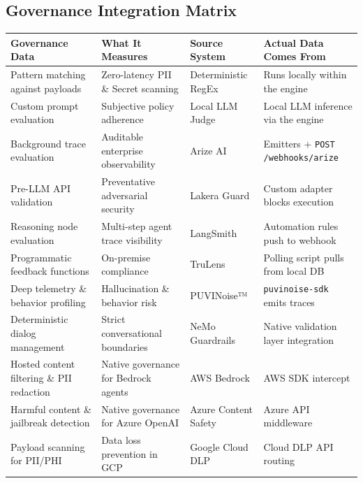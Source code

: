 \documentclass[11pt,a4paper]{article}
\begin{document}
\subsection{Governance Integration Matrix}

\begin{center}
\renewcommand{\arraystretch}{1.4}
\small
{}
\begin{tabularx}{\textwidth}{| >{\raggedright\arraybackslash}X >{\raggedright\arraybackslash}X >{\raggedright\arraybackslash}p{3cm} >{\raggedright\arraybackslash}X |}
\hline
\rowcolor{dpicloud!30} \textbf{Governance Data} & \textbf{What It Measures} & \textbf{Source System} & \textbf{Actual Data Comes From} \\
\hline
Pattern matching against payloads & Zero-latency PII \& Secret scanning & Deterministic RegEx & Runs locally within the engine \\
Custom prompt evaluation & Subjective policy adherence & Local LLM Judge & Local LLM inference via the engine \\
Background trace evaluation & Auditable enterprise observability & Arize AI & Emitters + \texttt{POST /webhooks/arize} \\
Pre-LLM API validation & Preventative adversarial security & Lakera Guard & Custom adapter blocks execution \\
Reasoning node evaluation & Multi-step agent trace visibility & LangSmith & Automation rules push to webhook \\
Programmatic feedback functions & On-premise compliance & TruLens & Polling script pulls from local DB \\
Deep telemetry \& behavior profiling & Hallucination \& behavior risk & PUVINoise™ & \texttt{puvinoise-sdk} emits traces \\
Deterministic dialog management & Strict conversational boundaries & NeMo Guardrails & Native validation layer integration \\
Hosted content filtering \& PII redaction & Native governance for Bedrock agents & AWS Bedrock & AWS SDK intercept \\
Harmful content \& jailbreak detection & Native governance for Azure OpenAI & Azure Content Safety & Azure API middleware \\
Payload scanning for PII/PHI & Data loss prevention in GCP & Google Cloud DLP & Cloud DLP API routing \\
\hline
\end{tabularx}
\end{center}
\end{document}
